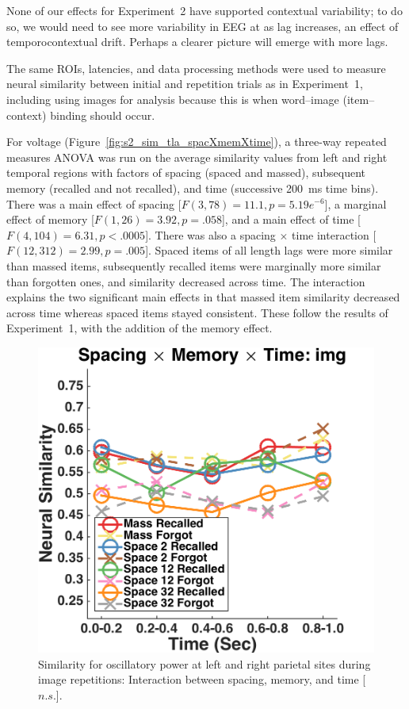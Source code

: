 
None of our effects for Experiment~2 have supported contextual variability; to do so, we would need to see more variability in EEG at as lag increases, an effect of temporocontextual drift.
Perhaps a clearer picture will emerge with more lags.


The same ROIs, latencies, and data processing methods were used to measure neural similarity between initial and repetition trials as in Experiment~1, including using images for analysis because this is when word--image (item--context) binding should occur.
 

For voltage (Figure~\ref{fig:s2_sim_tla_spacXmemXtime}), a three-way repeated measures ANOVA was run on the average similarity values from left and right temporal regions with factors of spacing (spaced and massed), subsequent memory (recalled and not recalled), and time (successive 200~ms time bins).  There was a main effect of spacing [$F(3,78)=11.1, p=5.19e^{-6}$], a marginal effect of memory [$F(1,26)=3.92, p=.058$], and a main effect of time [$F(4,104)=6.31, p<.0005$].  There was also a spacing $\times$ time interaction [$F(12,312)=2.99, p=.005$].  Spaced items of all length lags were more similar than massed items, subsequently recalled items were marginally more similar than forgotten ones, and similarity decreased across time.  The interaction explains the two significant main effects in that massed item similarity decreased across time whereas spaced items stayed consistent.  These follow the results of Experiment~1, with the addition of the memory effect.

\begin{figure}[H]
  \centering
  \includegraphics[width=.40\textwidth]{./figs/exp2/similarity_spacXmemXtime_img_pow_LPSRPS_0to200_200to400_400to600_600to800_800to1000_kaiser_cosine}
  \caption{Similarity for oscillatory power at left and right parietal sites during image repetitions: Interaction between spacing, memory, and time [$n.s.$].}
  \label{fig:s2_sim_pow_spacXmemXtime}
\end{figure}

